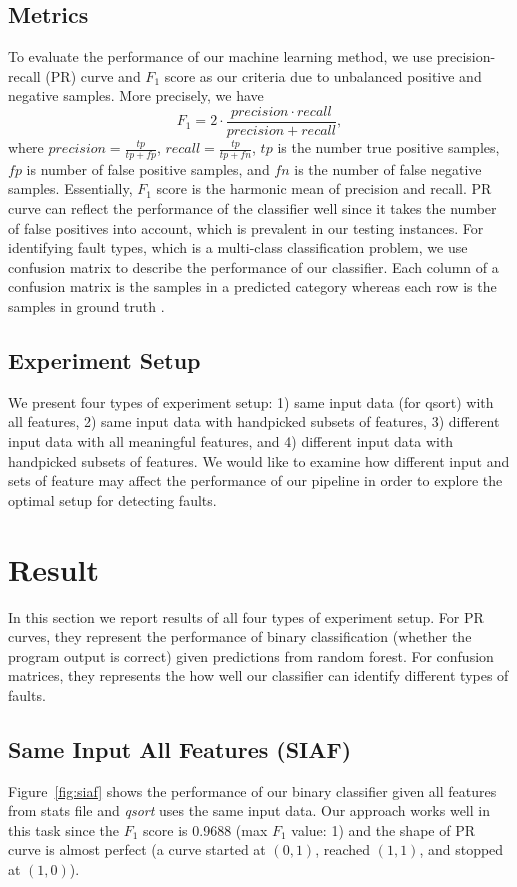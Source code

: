 \subsection{Metrics}
To evaluate the performance of our machine learning method, we use precision-recall (PR) curve and $F_1$ score as our criteria due to unbalanced positive and negative samples. More precisely, we have
\begin{equation}
F_{1} = 2\cdot\frac{precision \cdot recall}{precision + recall},
\end{equation}
where $precision = \frac{tp}{tp+fp}$, $recall = \frac{tp}{tp+fn}$, $tp$ is the number true positive samples, $fp$ is number of false positive samples, and $fn$ is the number of false negative samples. Essentially, $F_1$ score is the harmonic mean of precision and recall. PR curve can reflect the performance of the classifier well since it takes the number of false positives into account, which is prevalent in our testing instances. For identifying fault types, which is a multi-class classification problem, we use confusion matrix to describe the performance of our classifier. Each column of a confusion matrix is the samples in a predicted category whereas each row is the samples in ground truth \cite{powers2011evaluation}.

\subsection{Experiment Setup}
We present four types of experiment setup: 1) same input data (for qsort) with all features, 2) same input data with handpicked subsets of features, 3) different input data with all meaningful features, and 4) different input data with handpicked subsets of features. We would like to examine how different input and sets of feature  may affect the performance of our pipeline in order to explore the optimal setup for detecting faults.

\section{Result}
In this section we report results of all four types of experiment setup. For PR curves, they represent the performance of binary classification (whether the program output is correct) given predictions from random forest. For confusion matrices, they represents the how well our classifier can identify different types of faults.

\subsection{Same Input All Features (SIAF)}
Figure~\ref{fig:siaf} shows the performance of our binary classifier given all features from stats file and \emph{qsort} uses the same input data. Our approach works well in this task since the $F_1$ score is 0.9688 (max $F_1$ value: 1) and the shape of PR curve is almost perfect (a curve started at $(0,1)$, reached $(1,1)$, and stopped at $(1,0)$). 


